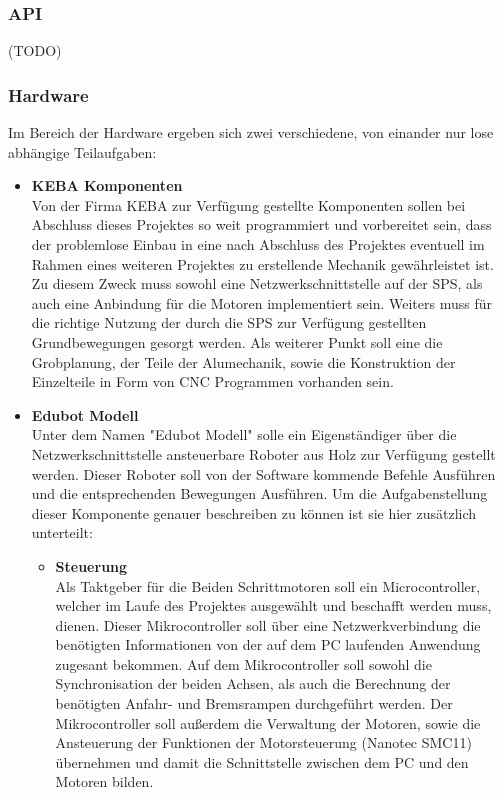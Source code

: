 \subsubsection{API}

(TODO)

\subsubsection{Hardware}
Im Bereich der Hardware ergeben sich zwei verschiedene, von einander nur lose abhängige Teilaufgaben:
\begin{itemize}
\item \textbf{KEBA Komponenten}\\
Von der Firma KEBA zur Verfügung gestellte Komponenten sollen bei Abschluss dieses Projektes so weit programmiert und vorbereitet sein, dass der problemlose Einbau in eine nach Abschluss des Projektes eventuell im Rahmen eines weiteren Projektes zu erstellende Mechanik gewährleistet ist. Zu diesem Zweck muss sowohl eine Netzwerkschnittstelle auf der SPS, als auch eine Anbindung für die Motoren implementiert sein. Weiters muss für die richtige Nutzung der durch die SPS zur Verfügung gestellten Grundbewegungen gesorgt werden.
Als weiterer Punkt soll eine die Grobplanung, der Teile der Alumechanik, sowie die Konstruktion der Einzelteile in Form von CNC Programmen vorhanden sein.
\item \textbf{Edubot Modell}\\
Unter dem Namen "Edubot Modell" solle ein Eigenständiger über die Netzwerkschnittstelle ansteuerbare Roboter aus Holz zur Verfügung gestellt werden. Dieser Roboter soll von der Software kommende Befehle Ausführen und die entsprechenden Bewegungen Ausführen. Um die Aufgabenstellung dieser Komponente genauer beschreiben zu können ist sie hier zusätzlich unterteilt:
\begin{itemize}
\item \textbf{Steuerung}\\
Als Taktgeber für die Beiden Schrittmotoren soll ein Microcontroller, welcher im Laufe des Projektes ausgewählt und beschafft werden muss, dienen. Dieser Mikrocontroller soll über eine Netzwerkverbindung die benötigten Informationen von der auf dem PC laufenden Anwendung zugesant bekommen.
Auf dem Mikrocontroller soll sowohl die Synchronisation der beiden Achsen, als auch die Berechnung der benötigten Anfahr- und Bremsrampen durchgeführt werden. Der Mikrocontroller soll außerdem die Verwaltung der Motoren, sowie die Ansteuerung der Funktionen der Motorsteuerung (Nanotec SMC11) übernehmen und damit die Schnittstelle zwischen dem PC und den Motoren bilden.

\end{itemize}
\end{itemize}
